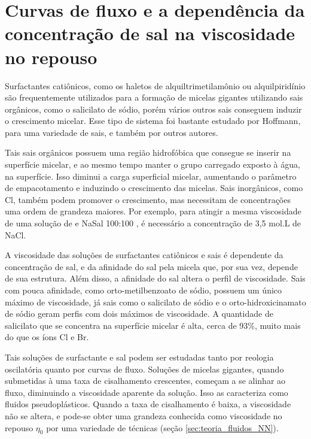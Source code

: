 		\section{Curvas de fluxo e a dependência da concentração de sal na viscosidade no repouso}
			
		Surfactantes catiônicos, como os haletos de alquiltrimetilamônio ou alquilpiridínio são frequentemente utilizados para a formação de micelas gigantes utilizando sais orgânicos, como o salicilato de sódio, porém vários outros sais conseguem induzir o crescimento micelar. Esse tipo de sistema foi bastante estudado por Hoffmann, para uma variedade de sais, e também por outros autores. %
		
		Tais sais orgânicos possuem uma região hidrofóbica que consegue se inserir na superfície micelar, e ao mesmo tempo manter o grupo carregado exposto à água, na superfície. Isso diminui a carga superficial micelar, aumentando o parâmetro de empacotamento e induzindo o crescimento das micelas. Sais inorgânicos, como Cl\menosUm{}, também podem promover o crescimento, mas necessitam de concentrações uma ordem de grandeza maiores. Por exemplo, para atingir a mesma viscosidade de uma solução de \CTAB{} e NaSal 100:100 \mM, é necessário a concentração de 3,5 mol.L\menosUm{} de NaCl. %
		
		A viscosidade das soluções de surfactantes catiônicos e sais é dependente da concentração de sal, e da afinidade do sal pela micela que, por sua vez, depende de sua estrutura. Além disso, a afinidade do sal altera o perfil de viscosidade. Sais com pouca afinidade, como orto-metilbenzoato de sódio, possuem um único máximo de viscosidade, já sais como o salicilato de sódio e o orto-hidroxicinamato de sódio geram perfis com dois máximos de viscosidade. %
		A quantidade de salicilato que se concentra na superfície micelar é alta, cerca de 93\%, muito mais do que os íons Cl\menosUm{} e Br\menosUm{}. %
		
		Tais soluções de surfactante e sal podem ser estudadas tanto por reologia oscilatória quanto por curvas de fluxo. Soluções de micelas gigantes, quando submetidas à uma taxa de cisalhamento crescentes, começam a se alinhar ao fluxo, diminuindo a viscosidade aparente da solução. Isso as caracteriza como fluidos pseudoplásticos. Quando a taxa de cisalhamento é baixa, a viscosidade não se altera, e pode-se obter uma grandeza conhecida como viscosidade no repouso \(\eta_0\) por uma variedade de técnicas (seção \ref{sec:teoria_fluidos_NN}).
		

